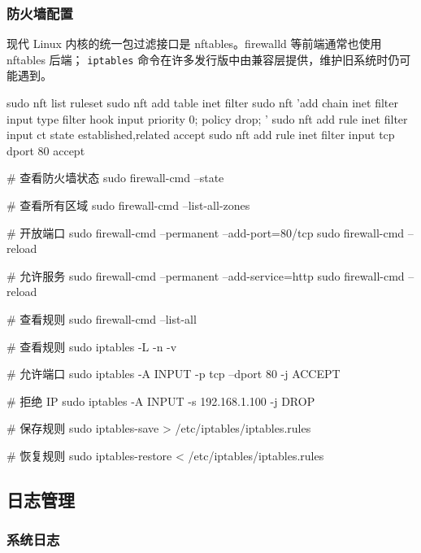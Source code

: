 \subsubsection{防火墙配置}

现代 Linux 内核的统一包过滤接口是 nftables。firewalld 等前端通常也使用 nftables 后端；
\texttt{iptables} 命令在许多发行版中由兼容层提供，维护旧系统时仍可能遇到。


\begin{lstcode}[numbers=none]
  sudo nft list ruleset
  sudo nft add table inet filter
  sudo nft 'add chain inet filter input { type filter hook input priority 0; policy drop; }'
  sudo nft add rule inet filter input ct state established,related accept
  sudo nft add rule inet filter input tcp dport 80 accept
\end{lstcode}


\begin{lstcode}[numbers=none]
  # 查看防火墙状态
  sudo firewall-cmd --state

  # 查看所有区域
  sudo firewall-cmd --list-all-zones

  # 开放端口
  sudo firewall-cmd --permanent --add-port=80/tcp
  sudo firewall-cmd --reload

  # 允许服务
  sudo firewall-cmd --permanent --add-service=http
  sudo firewall-cmd --reload

  # 查看规则
  sudo firewall-cmd --list-all
\end{lstcode}


\begin{lstcode}[numbers=none]
  # 查看规则
  sudo iptables -L -n -v

  # 允许端口
  sudo iptables -A INPUT -p tcp --dport 80 -j ACCEPT

  # 拒绝 IP
  sudo iptables -A INPUT -s 192.168.1.100 -j DROP

  # 保存规则
  sudo iptables-save > /etc/iptables/iptables.rules

  # 恢复规则
  sudo iptables-restore < /etc/iptables/iptables.rules
\end{lstcode}

\subsection{日志管理}

\subsubsection{系统日志}

